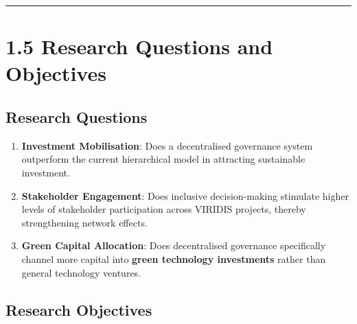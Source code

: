 \documentclass[
  english,
  12pt,
  oneside,
  open=any]{scrbook}
\providecommand{\tightlist}{%
  \setlength{\itemsep}{0pt}\setlength{\parskip}{0pt}}\usepackage{longtable,booktabs,array}
\begin{document}
\begin{center}\rule{0.5\linewidth}{0.5pt}\end{center}

\section{1.5 Research Questions and Objectives}\label{sec-rq}

\subsection{Research Questions}\label{research-questions}

\begin{enumerate}
\def\labelenumi{\arabic{enumi}.}
\tightlist
\item
  \textbf{Investment Mobilisation}: Does a decentralised governance
  system outperform the current hierarchical model in attracting
  sustainable investment.\\
\item
  \textbf{Stakeholder Engagement}: Does inclusive decision-making
  stimulate higher levels of stakeholder participation across VIRIDIS
  projects, thereby strengthening network effects.\\
\item
  \textbf{Green Capital Allocation}: Does decentralised governance
  specifically channel more capital into \textbf{green technology
  investments} rather than general technology ventures.
\end{enumerate}

\subsection{Research Objectives}\label{research-objectives}
\end{document}
